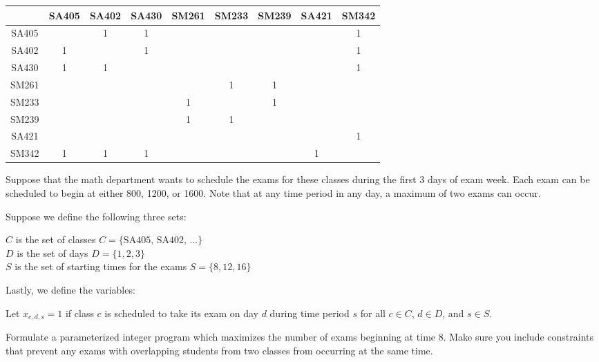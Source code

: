 \documentclass[letterpaper,oneside,12pt]{article}%
\begin{document}
\begin{enumerate}
\begin{center}\begin{tabular}{|c|cccccccc|}\hline
      & SA405 & SA402 & SA430 & SM261 & SM233 & SM239 & SA421 & SM342 \\ \hline
SA405 &       & 1     & 1     &       &       &       &       & 1      \\
SA402 & 1     &       & 1     &       &       &       &       & 1     \\
SA430 & 1     & 1     &       &       &       &       &       & 1     \\
SM261 &       &       &       &       & 1     &  1    &       &       \\
SM233 &       &       &       & 1     &       &  1    &       &       \\
SM239 &       &       &       & 1     & 1     &       &       &       \\
SA421 &       &       &       &       &       &       &       & 1     \\
SM342 & 1     &  1    & 1     &       &       &       &  1    &       \\ \hline
\end{tabular}\end{center}

Suppose that the math department wants to schedule the exams for these classes during the first 3 days of exam week. Each exam can be scheduled to begin at either 800, 1200, or 1600. Note that at any time period in any day, a maximum of two exams can occur.

Suppose we define the following three sets:

$C$ is the set of classes $C = \{\text{SA405, SA402, ...}\}$ \\
$D$ is the set of days $D = \{1,2,3\}$ \\
$S$ is the set of starting times for the exams $S = \{8,12,16\}$

Lastly, we define the variables:

Let $x_{c,d,s} = 1$ if class $c$ is scheduled to take its exam on day $d$ during time period $s$ for all $c \in C$, $d \in D$, and $s \in S$.

Formulate a parameterized integer program which maximizes the number of exams beginning at time 8. Make sure you include constraints that prevent any exams with overlapping students from two classes from occurring at the same time.

\end{enumerate}
\end{document}

